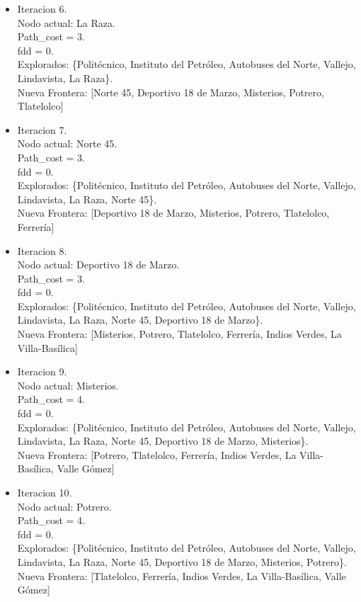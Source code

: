 \documentclass[10pt,a4paper]{article}
\begin{document}
\begin{itemize}
    \item Iteracion 6.\\
    Nodo actual: La Raza.\\
    Path\_cost = 3.\\
    fdd = 0.\\
    Explorados: \{Politécnico, Instituto del Petróleo, Autobuses del Norte, Vallejo, Lindavista, La Raza\}.\\
    Nueva Frontera: [Norte 45, Deportivo 18 de Marzo, Misterios, Potrero, Tlatelolco]

    \item Iteracion 7.\\
    Nodo actual: Norte 45.\\
    Path\_cost = 3.\\
    fdd = 0.\\
    Explorados: \{Politécnico, Instituto del Petróleo, Autobuses del Norte, Vallejo, Lindavista, La Raza, Norte 45\}.\\
    Nueva Frontera: [Deportivo 18 de Marzo, Misterios, Potrero, Tlatelolco, Ferrería]

    \item Iteracion 8.\\
    Nodo actual: Deportivo 18 de Marzo.\\
    Path\_cost = 3.\\
    fdd = 0.\\
    Explorados: \{Politécnico, Instituto del Petróleo, Autobuses del Norte, Vallejo, Lindavista, La Raza, Norte 45, Deportivo 18 de Marzo\}.\\
    Nueva Frontera: [Misterios, Potrero, Tlatelolco, Ferrería, Indios Verdes, La Villa-Basílica]

    \item Iteracion 9.\\
    Nodo actual: Misterios.\\
    Path\_cost = 4.\\
    fdd = 0.\\
    Explorados: \{Politécnico, Instituto del Petróleo, Autobuses del Norte, Vallejo, Lindavista, La Raza, Norte 45, Deportivo 18 de Marzo, Misterios\}.\\
    Nueva Frontera: [Potrero, Tlatelolco, Ferrería, Indios Verdes, La Villa-Basílica, Valle Gómez]

    \item Iteracion 10.\\
    Nodo actual: Potrero.\\
    Path\_cost = 4.\\
    fdd = 0.\\
    Explorados: \{Politécnico, Instituto del Petróleo, Autobuses del Norte, Vallejo, Lindavista, La Raza, Norte 45, Deportivo 18 de Marzo, Misterios, Potrero\}.\\
    Nueva Frontera: [Tlatelolco, Ferrería, Indios Verdes, La Villa-Basílica, Valle Gómez]


\end{itemize}
\end{document}
